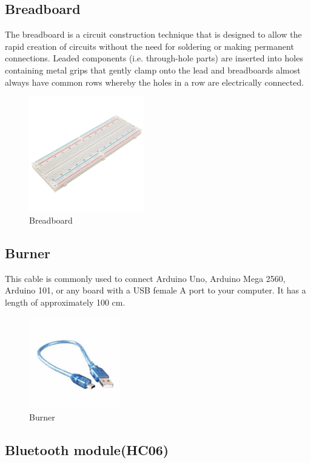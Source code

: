\documentclass[conference]{IEEEtran}
\begin{document}
\subsection{Breadboard}

The breadboard is a circuit construction technique that is designed to allow the rapid creation of circuits without the need for soldering or making permanent connections. Leaded components (i.e. through-hole parts) are inserted into holes containing metal grips that gently clamp onto the lead and breadboards almost always have common rows whereby the holes in a row are electrically connected.
\begin{figure}[th]
    \centering
    \includegraphics[height=5cm,width=\linewidth]{images/Breadboard.jpg}
    \caption{Breadboard}
    \label{fig:enter-label}
\end{figure}

\subsection{Burner}

This cable is commonly used to connect Arduino Uno, Arduino Mega 2560, Arduino 101, or any board with a USB female A port to your computer. It has a length of approximately 100 cm.
\begin{figure}[th]
    \centering
    \includegraphics[height=4cm,width=\linewidth]{images/Burner Cable.jpg}
    \caption{Burner}
    \label{fig:enter-label}
\end{figure}

\subsection{Bluetooth module(HC06)}
\end{document}
